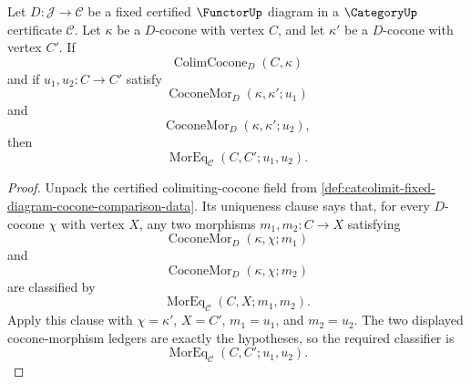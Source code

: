 \begin{corollary}\label{cor:catcolimit-comparison-fiber-collapse}
Let $D:\mathcal J\to\mathcal C$ be a fixed certified $\FunctorUp$ diagram in a $\CategoryUp$ certificate $\mathcal C$. Let $\kappa$ be a $D$-cocone with vertex $C$, and let $\kappa'$ be a $D$-cocone with vertex $C'$. If
$$
\operatorname{ColimCocone}_{D}(C,\kappa)
$$
and if $u_1,u_2:C\to C'$ satisfy
$$
\operatorname{CoconeMor}_{D}(\kappa,\kappa';u_1)
$$
and
$$
\operatorname{CoconeMor}_{D}(\kappa,\kappa';u_2),
$$
then
$$
\operatorname{MorEq}_{\mathcal C}(C,C';u_1,u_2).
$$
\end{corollary}
\begin{proof}
Unpack the certified colimiting-cocone field from \autoref{def:catcolimit-fixed-diagram-cocone-comparison-data}. Its uniqueness clause says that, for every $D$-cocone $\chi$ with vertex $X$, any two morphisms $m_1,m_2:C\to X$ satisfying
$$
\operatorname{CoconeMor}_{D}(\kappa,\chi;m_1)
$$
and
$$
\operatorname{CoconeMor}_{D}(\kappa,\chi;m_2)
$$
are classified by
$$
\operatorname{MorEq}_{\mathcal C}(C,X;m_1,m_2).
$$
Apply this clause with $\chi=\kappa'$, $X=C'$, $m_1=u_1$, and $m_2=u_2$. The two displayed cocone-morphism ledgers are exactly the hypotheses, so the required classifier is
$$
\operatorname{MorEq}_{\mathcal C}(C,C';u_1,u_2).
$$
\end{proof}

